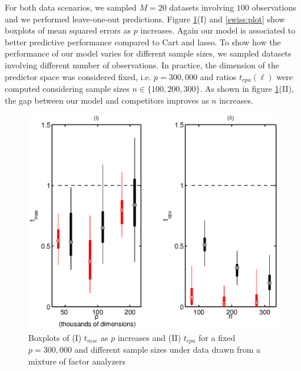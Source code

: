 \documentclass{article} %
\begin{document}
For both data scenarios, we sampled $M=20$ datasets involving $100$ observations and we performed leave-one-out predictions. Figure \ref{MFA:plot}(I) and  \ref{swiss:plot}  show boxplots of mean squared errors as $p$ increases.  Again our model is associated to better predictive performance compared to Cart and lasso. To show how the performance of our model varies for different sample sizes,  we sampled datasets involving different number of observations. In practice, the dimension of the predictor space was considered fixed, i.e. $p=300,000$ and ratios $t_{cpu}(\ell)$ were computed considering sample sizes $n \in \{100,200,300 \}$. As shown in figure \ref{MFA:plot}(II), the  gap between our model and competitors improves as $n$ increases. 


%
%


\begin{figure}[h!]
\centering
\includegraphics[width=1.0\linewidth]{boxplot_MFA.eps} 
\caption{Boxplots of (I) $t_{mse}$  as $p$ increases and (II) $t_{cpu}$ for a fixed $p=300,000$ and different sample sizes under data drawn from a mixture of factor analyzers} \label{MFA:plot}
\end{figure}
\end{document}
